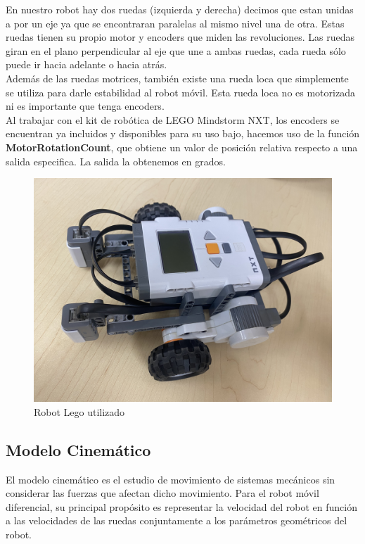 \documentclass[oneside,onecolumn]{article}
\begin{document}
En nuestro robot hay dos ruedas (izquierda y derecha) decimos que estan unidas a por un eje ya que se encontraran paralelas al mismo nivel una de otra. Estas ruedas tienen su propio motor y encoders que miden las revoluciones. Las ruedas giran en el plano perpendicular al eje que une a ambas ruedas, cada rueda sólo puede ir hacia adelante o hacia atrás.\\

Además de las ruedas motrices, también existe una rueda loca que simplemente se utiliza para darle estabilidad al robot móvil. Esta rueda loca no es motorizada ni es importante que tenga encoders.\\

Al trabajar con el kit de robótica de LEGO Mindstorm NXT, los encoders se encuentran ya incluidos y disponibles para su uso bajo, hacemos uso de la función \textbf{MotorRotationCount}, que obtiene un valor de posición relativa respecto a una salida especifica. La salida la obtenemos en grados.

\begin{figure}[h]
  \centering
  \includegraphics[scale=0.1]{graficos/robot.png}
  \caption{Robot Lego utilizado}
\end{figure}


\subsection{Modelo Cinemático}

El modelo cinemático es el estudio de movimiento de sistemas mecánicos sin considerar las fuerzas que afectan dicho movimiento. Para el robot móvil diferencial, su principal propósito es representar la velocidad del robot en función a las velocidades de las ruedas conjuntamente a los parámetros geométricos del robot.\\
\end{document}
